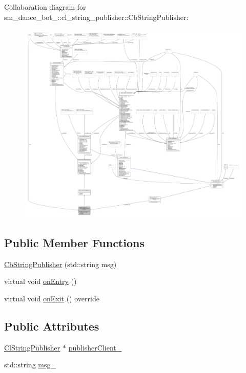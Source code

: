 Collaboration diagram for sm\+\_\+dance\+\_\+bot\+\_\+:\+:cl\+\_\+string\+\_\+publisher\+:\+:Cb\+String\+Publisher\+:
\nopagebreak
\begin{figure}[H]
\begin{center}
\leavevmode
\includegraphics[width=350pt]{classsm__dance__bot__2_1_1cl__string__publisher_1_1CbStringPublisher__coll__graph}
\end{center}
\end{figure}
\subsection*{Public Member Functions}
\begin{DoxyCompactItemize}
\item 
\hyperlink{classsm__dance__bot__2_1_1cl__string__publisher_1_1CbStringPublisher_a557c3ef581e3aa4d30ab4218b7d0f10b}{Cb\+String\+Publisher} (std\+::string msg)
\item 
virtual void \hyperlink{classsm__dance__bot__2_1_1cl__string__publisher_1_1CbStringPublisher_abc3c362ea55110f8d340e5cb4d901892}{on\+Entry} ()
\item 
virtual void \hyperlink{classsm__dance__bot__2_1_1cl__string__publisher_1_1CbStringPublisher_aee990acdb5ec33f1d22efafbe32216f2}{on\+Exit} () override
\end{DoxyCompactItemize}
\subsection*{Public Attributes}
\begin{DoxyCompactItemize}
\item 
\hyperlink{classsm__dance__bot__2_1_1cl__string__publisher_1_1ClStringPublisher}{Cl\+String\+Publisher} $\ast$ \hyperlink{classsm__dance__bot__2_1_1cl__string__publisher_1_1CbStringPublisher_a374db0f8b7ae20321f38c611108cb49a}{publisher\+Client\+\_\+}
\item 
std\+::string \hyperlink{classsm__dance__bot__2_1_1cl__string__publisher_1_1CbStringPublisher_aa4ec5323d074594371424668619997da}{msg\+\_\+}
\end{DoxyCompactItemize}

